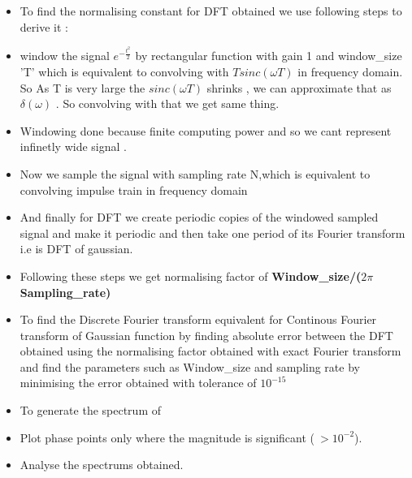\documentclass[8pt]{article}
\begin{document}
\begin{itemize}
\item
  To find the normalising constant for DFT obtained we use following
  steps to derive it :
\item
  window the signal \(e^{-\frac{t^{2}}{2}}\) by rectangular function
  with gain 1 and window\_size 'T' which is equivalent to convolving
  with \(Tsinc(\omega T)\) in frequency domain. So As T is very large
  the $sinc(\omega T) $ shrinks , we can approximate that as
  \(\delta(\omega)\) . So convolving with that we get same thing.
\item
  Windowing done because finite computing power and so we cant represent
  infinetly wide signal .
\item
  Now we sample the signal with sampling rate N,which is equivalent to
  convolving impulse train in frequency domain
\item
  And finally for DFT we create periodic copies of the windowed sampled
  signal and make it periodic and then take one period of its Fourier
  transform i.e is DFT of gaussian.
\item
  Following these steps we get normalising factor of
  \textbf{Window\_size/(\(2 \pi \ \)Sampling\_rate)}
\item
  To find the Discrete Fourier transform equivalent for Continous
  Fourier transform of Gaussian function by finding absolute error
  between the DFT obtained using the normalising factor obtained with
  exact Fourier transform and find the parameters such as Window\_size
  and sampling rate by minimising the error obtained with tolerance of
  \(10^{-15}\)
\item
  To generate the spectrum of\\
\item
  Plot phase points only where the magnitude is significant
  (\(\ > 10^{-2}\)).
\item
  Analyse the spectrums obtained.
\end{itemize}
\end{document}
